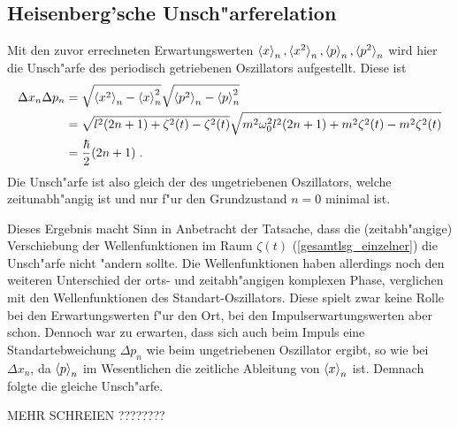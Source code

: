   \subsection{Heisenberg'sche Unsch"arferelation}
    Mit den zuvor errechneten Erwartungswerten $\braket{x}_n,\braket{x^2}_n,\braket{p}_n,\braket{p^2}_n$ wird hier die Unsch"arfe des periodisch getriebenen Oszillators aufgestellt.
    Diese ist
    \begin{align}
      \Delta x_n\Delta p_n &= \sqrt{\braket{x^2}_n-\braket{x}^2_n}\sqrt{\braket{p^2}_n-\braket{p}^2_n} \notag\\
      &= \sqrt{l^2(2n+1)+\zeta^2(t)-\zeta^2(t)}\sqrt{m^2\omega^2_0l^2(2n+1)+m^2\zeta^2(t)-m^2\zeta^2(t)} \notag\\
      &= \frac{\hbar}{2}(2n+1) \; .
    \end{align}
    Die Unsch"arfe ist also gleich der des ungetriebenen Oszillators, welche zeitunabh"angig ist und nur f"ur den Grundzustand $n=0$ minimal ist.

    Dieses Ergebnis macht Sinn in Anbetracht der Tatsache, dass die (zeitabh"angige) Verschiebung der Wellenfunktionen im Raum $\zeta(t)$ (\ref{gesamtlsg_einzelner}) die Unsch"arfe nicht "andern sollte.
    Die Wellenfunktionen haben allerdings noch den weiteren Unterschied der orts- und zeitabh"angigen komplexen Phase, verglichen mit den Wellenfunktionen des Standart-Oszillators.
    Diese spielt zwar keine  Rolle bei den Erwartungswerten f"ur den Ort, bei den Impulserwartungswerten aber schon.
    Dennoch war zu erwarten, dass sich auch beim Impuls eine Standartebweichung $\Delta p_n$ wie beim ungetriebenen Oszillator ergibt, so wie bei $\Delta x_n$, da $\braket{p}_n$ im Wesentlichen die zeitliche Ableitung von $\braket{x}_n$ ist.
    Demnach folgte die gleiche Unsch"arfe.

    MEHR SCHREIEN ????????

\iffalse
  \subsection{Erwartungswerte f"ur die Energie}
    Hier werden wir den normalen zeitabh"angigen Erwartungswert der Energie $\braket{H(t)}_n$ aufstellen.
    Weiterhin wird der zeitlich, "uber eine Periode $T$, gemittelten Erwartungswert $\bar H_n$ mittels Formel (\ref{mittleres_H}) f"ur eine beliebige Treibkraft bestimmt, indem wir die Quasienergien $\epsilon_n$ benutzen, welche wir in Kapitel \ref{espsilon_bel_kraft} f"ur eine allgemeine periodische Treibkraft $S(t)$, in Abh"angigkeit deren  Fourier-Koeffizienten, bestimmt haben.
\fi

